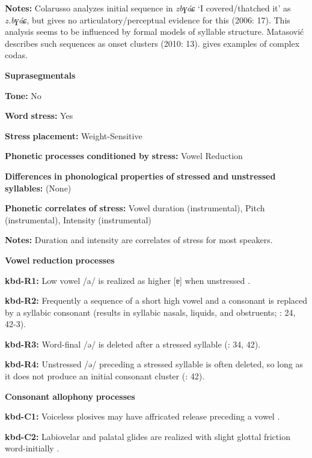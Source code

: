 \begin{styleBody}
\textbf{Notes:} Colarusso analyzes initial sequence in \textit{zbɣáɕ} ‘I covered/thatched it’ as \textit{z.bɣáɕ}, but gives no articulatory/perceptual evidence for this (2006: 17). This analysis seems to be influenced by formal models of syllable structure. Matasović describes such sequences as onset clusters (2010: 13). \citet{Applebaum2013} gives examples of complex codas.

\textbf{Suprasegmentals}

\textbf{Tone:} No

\textbf{Word} \textbf{stress:} Yes

\textbf{Stress} \textbf{placement:} Weight-Sensitive

\textbf{Phonetic} \textbf{processes} \textbf{conditioned} \textbf{by} \textbf{stress:} Vowel Reduction

\textbf{Differences} \textbf{in} \textbf{phonological} \textbf{properties} \textbf{of} \textbf{stressed} \textbf{and} \textbf{unstressed} \textbf{syllables:} (None)

\textbf{Phonetic} \textbf{correlates} \textbf{of} \textbf{stress:} Vowel duration (instrumental), Pitch (instrumental), Intensity (instrumental)

\textbf{Notes:} Duration and intensity are correlates of stress for most speakers.

\textbf{Vowel} \textbf{reduction} \textbf{processes}

\textbf{kbd-R1:} Low vowel /a/ is realized as higher [ɐ] when unstressed \citep[98-9]{Applebaum2013}.

\textbf{kbd-R2:} Frequently a sequence of a short high vowel and a consonant is replaced by a syllabic consonant (results in syllabic nasals, liquids, and obstruents; \citealt{Kuipers1960}: 24, 42-3).

\textbf{kbd-R3:} Word-final /ə/ is deleted after a stressed syllable (\citealt{Kuipers1960}: 34, 42).

\textbf{kbd-R4:} Unstressed /ə/ preceding a stressed syllable is often deleted, so long as it does not produce an initial consonant cluster (\citealt{GordonApplebaum2010}: 42).

\textbf{Consonant} \textbf{allophony} \textbf{processes}

\textbf{kbd-C1:} Voiceless plosives may have affricated release preceding a vowel \citep[17]{Kuipers1960}.

\textbf{kbd-C2:} Labiovelar and palatal glides are realized with slight glottal friction word-initially \citep[22]{Kuipers1960}.


\end{styleBody}
